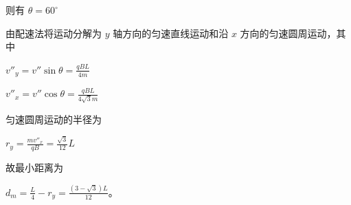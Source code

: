 \documentclass[\gkver]{gaokaozhenti}
\begin{document}
\begin{enumerate}
{则有 $\theta = 60^{\circ}$

由配速法将运动分解为 $y$ 轴方向的匀速直线运动和沿 $x$ 方向的匀速圆周运动，其中

$v''_{y} = v''\sin\theta = \frac{qBL}{4m}$

$v''_{x} = v''\cos\theta = \frac{qBL}{4\sqrt{3}m}$

匀速圆周运动的半径为

$r_{y} = \frac{mv''_{x}}{qB} = \frac{\sqrt{3}}{12}L$

故最小距离为

$d_{m} = \frac{L}{4} - r_{y} = \frac{(3 - \sqrt{3})L}{12}$。
}

\end{enumerate}
\end{document}
